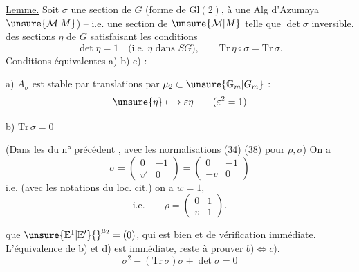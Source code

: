 
\uline{Lemme.} Soit $\sigma$ une section de $G$ (forme de
$\mathrm{Gl}(2)$,  à une Alg d'Azumaya
$\unsure{\mathcal M|M}$) -- i.e. une section de
$\unsure{\mathcal M|M}$ telle que $\det\sigma$ inversible.
des sections $\eta$  de $G$ satisfaisant les conditions
\[
\det\eta=1\quad\text{(i.e. $\eta$ dans $SG$)},\qquad
\mathrm{Tr}\,\eta\circ\sigma=\mathrm{Tr}\,\sigma.
\]
Conditions équivalentes a) b) c) :

a) $A_\sigma$ est stable par translations par
$\mu_2\subset\unsure{\mathbb G_m|G_m}$ :
\[
\unsure{\eta}\longmapsto\varepsilon\eta\qquad(\varepsilon^2=1)
\]

b) $\mathrm{Tr}\,\sigma=0$


 (Dans les  du n° précédent
,
avec les normalisations (34) (38) pour $\rho,\sigma$) On a
\[
\tag{6}
\sigma=\begin{pmatrix}0&-1\\v'&0\end{pmatrix}
=\begin{pmatrix}0&-1\\-v&0\end{pmatrix}
\]
i.e. (avec les notations du loc. cit.) on a $w=1$,
\[
\tag{7}
\text{i.e.}\qquad
\rho=\begin{pmatrix}0&1\\v&1\end{pmatrix}.
\]



que $\unsure{\mathbb E^1|\mathbb E'}{}^{\mu_2}=(0)$, qui est bien
 et de vérification immédiate.
L'équivalence de b) et d) est immédiate, reste à prouver
$b)\Longleftrightarrow c)$.
\[
\sigma^2-(\mathrm{Tr}\,\sigma)\sigma+\det\sigma=0
\]

